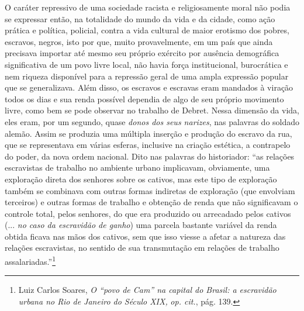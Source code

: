 O caráter repressivo de uma sociedade racista e religiosamente moral não
podia se expressar então, na totalidade do mundo da vida e da cidade,
como ação prática e política, policial, contra a vida cultural de maior
erotismo dos pobres, escravos, negros, isto por que, muito
provavelmente, em um país que ainda precisava importar até mesmo seu
próprio exército por ausência demográfica significativa de um povo livre
local, não havia força institucional, burocrática e nem riqueza
disponível para a repressão geral de uma ampla expressão popular que se
generalizava. Além disso, os escravos e escravas eram mandados à viração
todos os dias e sua renda possível dependia de algo de seu próprio
movimento livre, como bem se pode observar no trabalho de Debret. Nessa
dimensão da vida, eles eram, por um segundo, quase \emph{donos dos seus
narizes}, nas palavras do soldado alemão. Assim se produzia uma múltipla
inserção e produção do escravo da rua, que se representava em várias
esferas, inclusive na criação estética, a contrapelo do poder, da nova
ordem nacional. Dito nas palavras do historiador: ``as relações
escravistas de trabalho no ambiente urbano implicavam, obviamente, uma
exploração direta dos senhores sobre os cativos, mas este tipo de
exploração também se combinava com outras formas indiretas de exploração
(que envolviam terceiros) e outras formas de trabalho e obtenção de
renda que não significavam o controle total, pelos senhores, do que era
produzido ou arrecadado pelos cativos (... \emph{no caso da escravidão
de ganho}) uma parcela bastante variável da renda obtida ficava nas mãos
dos cativos, sem que isso viesse a afetar a natureza das relações
escravistas, no sentido de sua transmutação em relações de trabalho
assalariadas.''\footnote{Luiz Carlos Soares, \emph{O ``povo de Cam'' na
  capital do Brasil: a escravidão urbana no Rio de Janeiro do Século
  XIX,} \emph{op. cit.}, pág. 139.}

